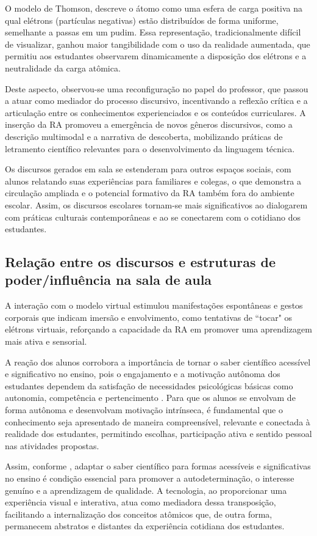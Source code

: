 \documentclass[portuguese]{textolivre}
\begin{document}
O modelo de Thomson, descreve o átomo como uma esfera de carga positiva na qual elétrons (partículas negativas) estão distribuídos de forma uniforme, semelhante a passas em um pudim. Essa representação, tradicionalmente difícil de visualizar, ganhou maior tangibilidade com o uso da realidade aumentada, que permitiu aos estudantes observarem dinamicamente a disposição dos elétrons e a neutralidade da carga atômica.

Deste aspecto, observou-se uma reconfiguração no papel do professor, que passou a atuar como mediador do processo discursivo, incentivando a reflexão crítica e a articulação entre os conhecimentos experienciados e os conteúdos curriculares. A inserção da RA promoveu a emergência de novos gêneros discursivos, como a descrição multimodal e a narrativa de descoberta, mobilizando práticas de letramento científico relevantes para o desenvolvimento da linguagem técnica.

Os discursos gerados em sala se estenderam para outros espaços sociais, com alunos relatando suas experiências para familiares e colegas, o que demonstra a circulação ampliada e o potencial formativo da RA também fora do ambiente escolar. Assim, os discursos escolares tornam-se mais significativos ao dialogarem com práticas culturais contemporâneas e ao se conectarem com o cotidiano dos estudantes.

\subsection{Relação entre os discursos e estruturas de poder/influência na sala de aula}
A interação com o modelo virtual estimulou manifestações espontâneas e gestos corporais que indicam imersão e envolvimento, como tentativas de ``tocar" os elétrons virtuais, reforçando a capacidade da RA em promover uma aprendizagem mais ativa e sensorial.

A reação dos alunos corrobora a importância de tornar o saber científico acessível e significativo no ensino, pois o engajamento e a motivação autônoma dos estudantes dependem da satisfação de necessidades psicológicas básicas como autonomia, competência e pertencimento \cite{deci2008}. Para que os alunos se envolvam de forma autônoma e desenvolvam motivação intrínseca, é fundamental que o conhecimento seja apresentado de maneira compreensível, relevante e conectada à realidade dos estudantes, permitindo escolhas, participação ativa e sentido pessoal nas atividades propostas.

Assim, conforme \textcite{deci2008}, adaptar o saber científico para formas acessíveis e significativas no ensino é condição essencial para promover a autodeterminação, o interesse genuíno e a aprendizagem de qualidade. A tecnologia, ao proporcionar uma experiência visual e interativa, atua como mediadora dessa transposição, facilitando a internalização dos conceitos atômicos que, de outra forma, permanecem abstratos e distantes da experiência cotidiana dos estudantes.
\end{document}
